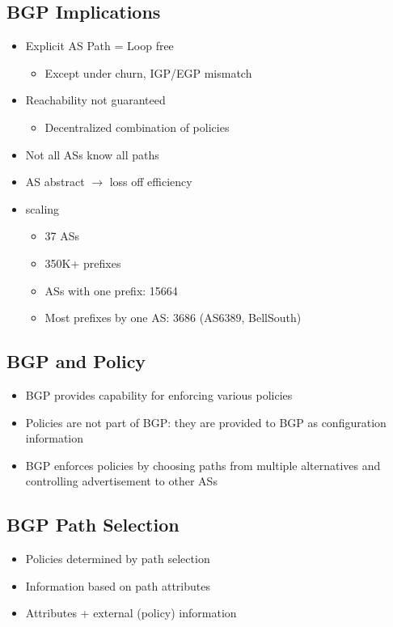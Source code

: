 \subsection{BGP Implications}
\begin{itemize}[nosep]
    \item Explicit AS Path = Loop free
          \begin{itemize}[nosep]
              \item Except under churn, IGP/EGP mismatch
          \end{itemize}
    \item Reachability not guaranteed
          \begin{itemize}[nosep]
              \item Decentralized combination of policies
          \end{itemize}
    \item Not all ASs know all paths
    \item AS abstract $\to$ loss off efficiency
    \item scaling
          \begin{itemize}[nosep]
              \item 37 ASs
              \item 350K+ prefixes
              \item ASs with one prefix: 15664
              \item Most prefixes by one AS: 3686 (AS6389, BellSouth)
          \end{itemize}
\end{itemize}

\subsection{BGP and Policy}
\begin{itemize}[nosep]
    \item BGP provides capability for enforcing various policies
    \item Policies are not part of BGP: they are provided to BGP as configuration information
    \item BGP enforces policies by choosing paths from multiple alternatives and controlling advertisement to other ASs
\end{itemize}

\subsection{BGP Path Selection}
\begin{itemize}[nosep]
    \item Policies determined by path selection
    \item Information based on path attributes
    \item Attributes + external (policy) information
\end{itemize}

